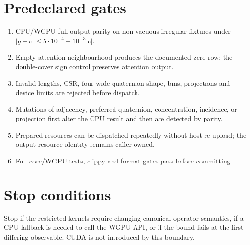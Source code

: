 \documentclass[10pt,a4paper]{article}
\begin{document}
\section{Predeclared gates}
\begin{enumerate}
\item CPU/WGPU full-output parity on non-vacuous irregular fixtures under
$|g-c|\le5\cdot10^{-4}+10^{-3}|c|$.
\item Empty attention neighbourhood produces the documented zero row; the
double-cover sign control preserves attention output.
\item Invalid lengths, CSR, four-wide quaternion shape, bins, projections and
device limits are rejected before dispatch.
\item Mutations of adjacency, preferred quaternion, concentration, incidence,
or projection first alter the CPU result and then are detected by parity.
\item Prepared resources can be dispatched repeatedly without host re-upload;
the output resource identity remains caller-owned.
\item Full core/WGPU tests, clippy and format gates pass before committing.
\end{enumerate}

\section{Stop conditions}
Stop if the restricted kernels require changing canonical operator semantics,
if a CPU fallback is needed to call the WGPU API, or if the bound fails at the
first differing observable.  CUDA is not introduced by this boundary.
\end{document}

